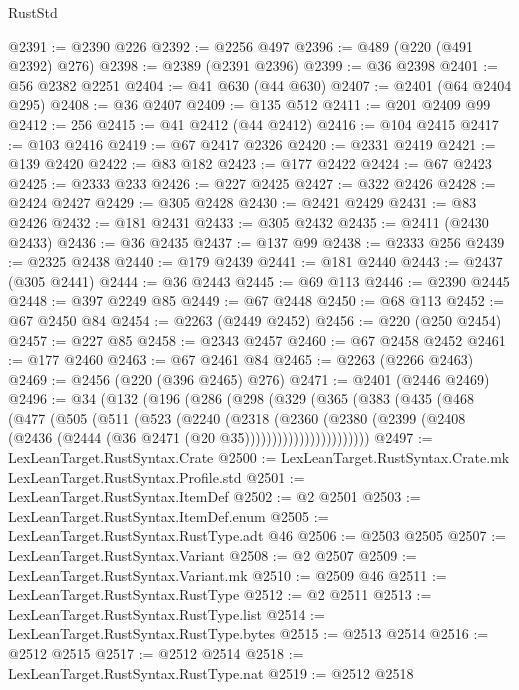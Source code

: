 \begin{lexlean}{RustStd}
\begin{coremodule}
{\begin{coremodule}
{{{{{{{{{{{{{{{{{{{{{{{{{{@2391 := @2390 @226
@2392 := @2256 @497
@2396 := @489 (@220 (@491 @2392) @276)
@2398 := @2389 (@2391 @2396)
@2399 := @36 @2398
@2401 := @56 @2382 @2251
@2404 := @41 @630 (@44 @630)
@2407 := @2401 (@64 @2404 @295)
@2408 := @36 @2407
@2409 := @135 @512
@2411 := @201 @2409 @99
@2412 := 256
@2415 := @41 @2412 (@44 @2412)
@2416 := @104 @2415
@2417 := @103 @2416
@2419 := @67 @2417 @2326
@2420 := @2331 @2419
@2421 := @139 @2420
@2422 := @83 @182
@2423 := @177 @2422
@2424 := @67 @2423
@2425 := @2333 @233
@2426 := @227 @2425
@2427 := @322 @2426
@2428 := @2424 @2427
@2429 := @305 @2428
@2430 := @2421 @2429
@2431 := @83 @2426
@2432 := @181 @2431
@2433 := @305 @2432
@2435 := @2411 (@2430 @2433)
@2436 := @36 @2435
@2437 := @137 @99
@2438 := @2333 @256
@2439 := @2325 @2438
@2440 := @179 @2439
@2441 := @181 @2440
@2443 := @2437 (@305 @2441)
@2444 := @36 @2443
@2445 := @69 @113
@2446 := @2390 @2445
@2448 := @397 @2249 @85
@2449 := @67 @2448
@2450 := @68 @113
@2452 := @67 @2450 @84
@2454 := @2263 (@2449 @2452)
@2456 := @220 (@250 @2454)
@2457 := @227 @85
@2458 := @2343 @2457
@2460 := @67 @2458 @2452
@2461 := @177 @2460
@2463 := @67 @2461 @84
@2465 := @2263 (@2266 @2463)
@2469 := @2456 (@220 (@396 @2465) @276)
@2471 := @2401 (@2446 @2469)
@2496 := @34
    (@132
      (@196
        (@286
          (@298
            (@329
              (@365
                (@383
                  (@435
                    (@468
                      (@477
                        (@505
                          (@511
                            (@523
                              (@2240
                                (@2318
                                  (@2360
                                    (@2380
                                      (@2399
                                        (@2408
                                          (@2436 (@2444 (@36 @2471 (@20 @35)))))))))))))))))))))))
@2497 := LexLeanTarget.RustSyntax.Crate
@2500 := LexLeanTarget.RustSyntax.Crate.mk LexLeanTarget.RustSyntax.Profile.std
@2501 := LexLeanTarget.RustSyntax.ItemDef
@2502 := @2 @2501
@2503 := LexLeanTarget.RustSyntax.ItemDef.enum
@2505 := LexLeanTarget.RustSyntax.RustType.adt @46
@2506 := @2503 @2505
@2507 := LexLeanTarget.RustSyntax.Variant
@2508 := @2 @2507
@2509 := LexLeanTarget.RustSyntax.Variant.mk
@2510 := @2509 @46
@2511 := LexLeanTarget.RustSyntax.RustType
@2512 := @2 @2511
@2513 := LexLeanTarget.RustSyntax.RustType.list
@2514 := LexLeanTarget.RustSyntax.RustType.bytes
@2515 := @2513 @2514
@2516 := @2512 @2515
@2517 := @2512 @2514
@2518 := LexLeanTarget.RustSyntax.RustType.nat
@2519 := @2512 @2518
}}}}}}}}}}}}}}}}}}}}}}}}}}
\end{coremodule}}
\end{coremodule}
\end{lexlean}
